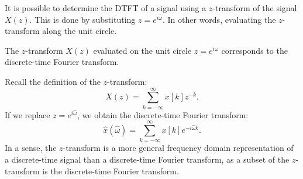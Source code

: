It is possible to determine the DTFT of a signal using a $z$-transform
of the signal $X(z)$. This is done by substituting
$z=e^{i\hat{\omega}}$. In other words, evaluating the $z$-transform
along the unit circle.

\begin{marginfigure}
\begin{center}
\end{center}
\caption{The $z$-transform $X(z)$ evaluated on the unit circle $z=e^{i\hat{\omega}}$ corresponds to the discrete-time Fourier transform. }
\end{marginfigure}

Recall the definition of the $z$-transform:
\begin{equation}
X(z) = \sum_{k=-\infty}^{\infty} x[k] z^{-k}.
\label{zfr}
\end{equation}
If we replace $z=e^{i\hat{\omega}}$, we obtain the discrete-time Fourier transform:
\begin{equation}
\hat{x}(\hat{\omega}) = \sum_{k=-\infty}^{\infty} x[k] e^{-i\hat{\omega}k}.
\label{zfr2}
\end{equation}
In a sense, the $z$-transform is a more general frequency domain
representation of a discrete-time signal than a discrete-time Fourier
transform, as a subset of the $z$-transform is the discrete-time Fourier
transform.

